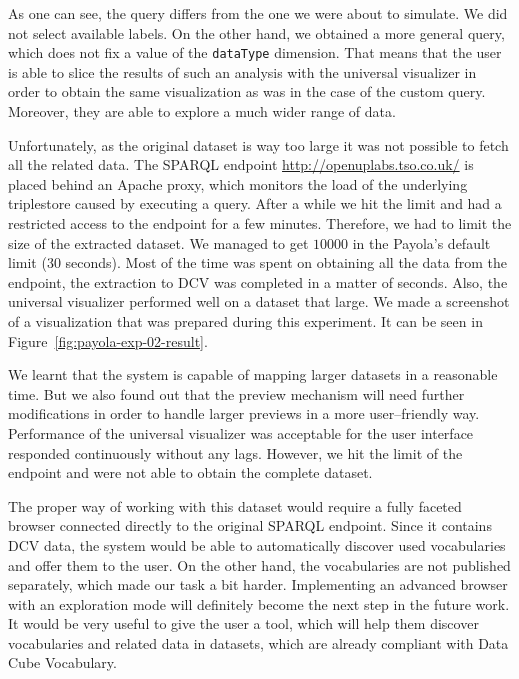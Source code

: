 As one can see, the query differs from the one we were about to simulate. We 
did not select available labels. On the other hand, we obtained a more general 
query, which does not fix a value of the \texttt{dataType} dimension. That means 
that the user is able to slice the results of such an analysis with the universal 
visualizer in order to obtain the same visualization as was in the case of the custom 
query. Moreover, they are able to explore a much wider range of data.  

\begin{sloppypar}
Unfortunately, as the original dataset is way too large it was not possible to 
fetch all the related data. The SPARQL endpoint \mbox{\url{http://openuplabs.tso.co.uk/}}
is placed behind an Apache proxy, which monitors the load of the underlying 
triplestore caused by executing a query. After a while we hit the limit and had a 
restricted access to the endpoint for a few minutes. Therefore, we had to limit 
the size of the extracted dataset. We managed to get $10000$ in the Payola's 
default limit (30 seconds). Most of the time was spent on obtaining all the 
data from the endpoint, the extraction to DCV was completed in a matter of 
seconds. Also, the universal visualizer performed well on a dataset that large.
We made a screenshot of a visualization that was prepared during this experiment.
It can be seen in Figure~\ref{fig:payola-exp-02-result}.
\end{sloppypar}

We learnt that the system is capable of mapping larger datasets in a reasonable 
time. But we also found out that the preview mechanism will need further 
modifications in order to handle larger previews in a more user--friendly way. 
Performance of the universal visualizer was acceptable for the user interface 
responded continuously without any lags. However, we hit the limit of the 
endpoint and were not able to obtain the complete dataset. 

The proper way of working with this dataset would require a fully faceted 
browser connected directly to the original SPARQL endpoint. Since it contains 
DCV data, the system would be able to automatically discover used vocabularies 
and offer them to the user. On the other hand, the vocabularies are not published
separately, which made our task a bit harder. Implementing an advanced browser
with an exploration mode will definitely become the next step in the future work. It 
would be very useful to give the user a tool, which will help them 
discover vocabularies and related data in datasets, which are already compliant 
with Data Cube Vocabulary.


